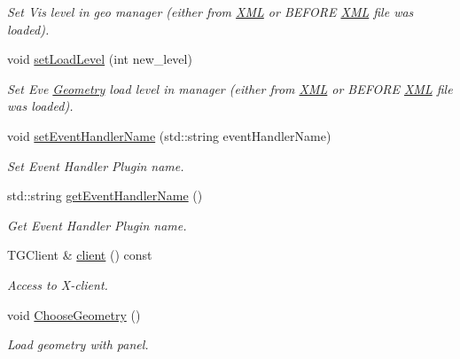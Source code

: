 \begin{DoxyCompactItemize}
\begin{DoxyCompactList}\small\item\em Set Vis level in geo manager (either from \hyperlink{namespace_d_d4hep_1_1_x_m_l}{XML} or BEFORE \hyperlink{namespace_d_d4hep_1_1_x_m_l}{XML} file was loaded). \item\end{DoxyCompactList}\item 
void \hyperlink{class_d_d4hep_1_1_display_a40be77ac29040ee1847af97871b78259}{setLoadLevel} (int new\_\-level)
\begin{DoxyCompactList}\small\item\em Set Eve \hyperlink{namespace_d_d4hep_1_1_geometry}{Geometry} load level in manager (either from \hyperlink{namespace_d_d4hep_1_1_x_m_l}{XML} or BEFORE \hyperlink{namespace_d_d4hep_1_1_x_m_l}{XML} file was loaded). \item\end{DoxyCompactList}\item 
void \hyperlink{class_d_d4hep_1_1_display_a41734ab371228987decf1ab66c989f56}{setEventHandlerName} (std::string eventHandlerName)
\begin{DoxyCompactList}\small\item\em Set Event Handler Plugin name. \item\end{DoxyCompactList}\item 
std::string \hyperlink{class_d_d4hep_1_1_display_a1772bccbb5c196bbf33d9cfadb0ce9ad}{getEventHandlerName} ()
\begin{DoxyCompactList}\small\item\em Get Event Handler Plugin name. \item\end{DoxyCompactList}\item 
TGClient \& \hyperlink{class_d_d4hep_1_1_display_af288800c5dd6b506fa44db0b214fe0ea}{client} () const 
\begin{DoxyCompactList}\small\item\em Access to X-\/client. \item\end{DoxyCompactList}\item 
void \hyperlink{class_d_d4hep_1_1_display_aa6b61d0d86f9307e516996d71b38abfa}{ChooseGeometry} ()
\begin{DoxyCompactList}\small\item\em Load geometry with panel. \item\end{DoxyCompactList}\item 

\end{DoxyCompactItemize}
